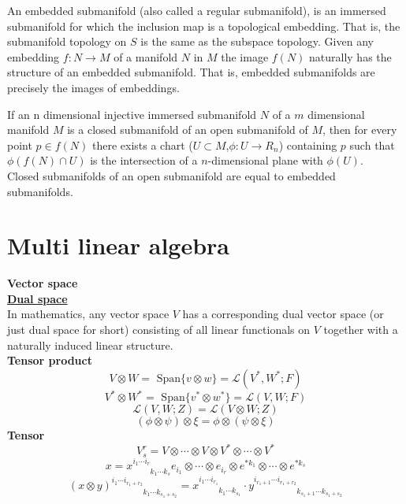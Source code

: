 \begin{newdef}
An embedded submanifold (also called a regular submanifold), is an immersed submanifold for which the inclusion map is a topological embedding. That is, the submanifold topology on $S$ is the same as the subspace topology. Given any embedding $f:N \to M$ of a manifold $N$ in $M$ the image $f(N)$ naturally has the structure of an embedded submanifold. That is, embedded submanifolds are precisely the images of embeddings.
\end{newdef}

\begin{newprop}[]
If an n dimensional injective immersed submanifold $N$ of a $m$ dimensional manifold $M$ is a closed submanifold of an open submanifold of $M$, then for every point $p \in f(N)$ there exists a chart ($U \subset M$,$\phi:U \to R_n $) containing $p$ such that $\phi(f(N) \cap U)$ is the intersection of a $n$-dimensional plane with $\phi(U)$.\\
Closed submanifolds of an open submanifold are equal to embedded submanifolds.
\end{newprop}

\section{Multi linear algebra}
\begin{newdef}[Tensor]
\textbf{Vector space}\\
\href{https://en.wikipedia.org/wiki/Dual_space}{\textbf{Dual space}}\\
In mathematics, any vector space $V$ has a corresponding dual vector space (or just dual space for short) consisting of all linear functionals on $V$ together with a naturally induced linear structure.\\
\textbf{Tensor product}
\[V \otimes W = \mbox{ Span}\{ v \otimes w \} = \mathcal{L}(V^*,W^*;F)\]
\[V^* \otimes W^* = \mbox{ Span}\{ v^* \otimes w^* \} = \mathcal{L}(V,W;F)\]
\[\mathcal{L}(V,W;Z)=\mathcal{L}(V \otimes W;Z)\]
\[(\phi \otimes \psi)\otimes \xi = \phi \otimes (\psi \otimes \xi)\]
\textbf{Tensor}
\[V_s^r = V \otimes \cdots \otimes V \otimes V^* \otimes \cdots \otimes V^*\]
\[x=x^{i_1 \cdots i_r}_{\phantom{i_1 \cdots i_r} k_1 \cdots k_s} e_{i_1} \otimes \cdots \otimes e_{i_r} \otimes e^{*k_1} \otimes \cdots \otimes e^{*k_s}\]
\[(x \otimes y)^{i_1 \cdots i_{r_1+r_2}}_{\phantom{i_1 \cdots i_{r_1+r_2}} k_1 \cdots k_{s_1+s_2}} = 
x^{i_1 \cdots i_{r_1}}_{\phantom{i_1 \cdots i_{r_1}}k_1 \cdots k_{s_1}} \cdot y^{i_{r_1+1} \cdots i_{r_1+r_2}}_{\phantom{i_{r_1+1} \cdots i_{r_1+r_2}}k_{s_1+1} \cdots k_{s_1+s_2}}\]
\end{newdef}

